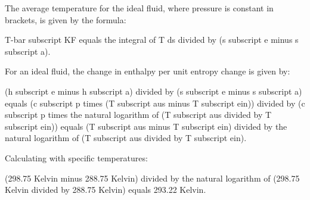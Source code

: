 The average temperature for the ideal fluid, where pressure is constant in brackets, is given by the formula:

T-bar subscript KF equals the integral of T ds divided by (s subscript e minus s subscript a).

For an ideal fluid, the change in enthalpy per unit entropy change is given by:

(h subscript e minus h subscript a) divided by (s subscript e minus s subscript a) equals (c subscript p times (T subscript aus minus T subscript ein)) divided by (c subscript p times the natural logarithm of (T subscript aus divided by T subscript ein)) equals (T subscript aus minus T subscript ein) divided by the natural logarithm of (T subscript aus divided by T subscript ein).

Calculating with specific temperatures:

(298.75 Kelvin minus 288.75 Kelvin) divided by the natural logarithm of (298.75 Kelvin divided by 288.75 Kelvin) equals 293.22 Kelvin.